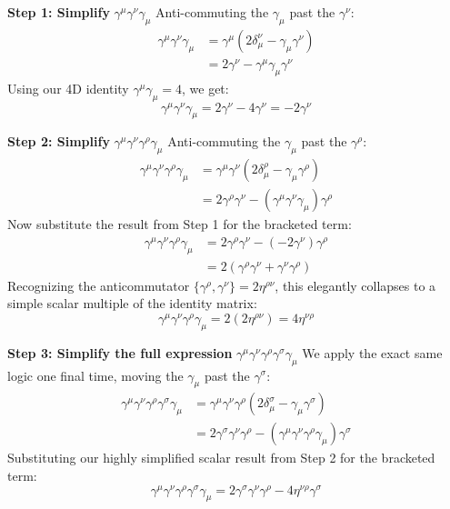 \textbf{Step 1: Simplify } $\gamma^\mu \gamma^\nu \gamma_\mu$
Anti-commuting the $\gamma_\mu$ past the $\gamma^\nu$:
\[
    \begin{aligned}
        \gamma^\mu \gamma^\nu \gamma_\mu & = \gamma^\mu (2\delta^\nu_\mu - \gamma_\mu \gamma^\nu) \\
                                         & = 2\gamma^\nu - \gamma^\mu \gamma_\mu \gamma^\nu
    \end{aligned}
\]
Using our 4D identity $\gamma^\mu \gamma_\mu = 4$, we get:
\[
    \gamma^\mu \gamma^\nu \gamma_\mu = 2\gamma^\nu - 4\gamma^\nu = -2\gamma^\nu
\]

\textbf{Step 2: Simplify } $\gamma^\mu \gamma^\nu \gamma^\rho \gamma_\mu$
Anti-commuting the $\gamma_\mu$ past the $\gamma^\rho$:
\[
    \begin{aligned}
        \gamma^\mu \gamma^\nu \gamma^\rho \gamma_\mu & = \gamma^\mu \gamma^\nu (2\delta^\rho_\mu - \gamma_\mu \gamma^\rho)        \\
                                                     & = 2\gamma^\rho \gamma^\nu - (\gamma^\mu \gamma^\nu \gamma_\mu) \gamma^\rho
    \end{aligned}
\]
Now substitute the result from Step 1 for the bracketed term:
\[
    \begin{aligned}
        \gamma^\mu \gamma^\nu \gamma^\rho \gamma_\mu & = 2\gamma^\rho \gamma^\nu - (-2\gamma^\nu) \gamma^\rho \\
                                                     & = 2(\gamma^\rho \gamma^\nu + \gamma^\nu \gamma^\rho)
    \end{aligned}
\]
Recognizing the anticommutator $\{ \gamma^\rho, \gamma^\nu \} = 2\eta^{\rho\nu}$, this elegantly collapses to a simple scalar multiple of the identity matrix:
\[
    \gamma^\mu \gamma^\nu \gamma^\rho \gamma_\mu = 2(2\eta^{\rho\nu}) = 4\eta^{\nu\rho}
\]

\textbf{Step 3: Simplify the full expression } $\gamma^\mu \gamma^\nu \gamma^\rho \gamma^\sigma \gamma_\mu$
We apply the exact same logic one final time, moving the $\gamma_\mu$ past the $\gamma^\sigma$:
\[
    \begin{aligned}
        \gamma^\mu \gamma^\nu \gamma^\rho \gamma^\sigma \gamma_\mu & = \gamma^\mu \gamma^\nu \gamma^\rho (2\delta^\sigma_\mu - \gamma_\mu \gamma^\sigma)                    \\
                                                                   & = 2\gamma^\sigma \gamma^\nu \gamma^\rho - (\gamma^\mu \gamma^\nu \gamma^\rho \gamma_\mu) \gamma^\sigma
    \end{aligned}
\]
Substituting our highly simplified scalar result from Step 2 for the bracketed term:
\[
    \gamma^\mu \gamma^\nu \gamma^\rho \gamma^\sigma \gamma_\mu = 2\gamma^\sigma \gamma^\nu \gamma^\rho - 4\eta^{\nu\rho} \gamma^\sigma
\]

